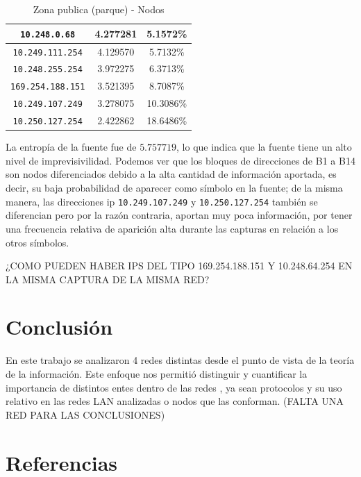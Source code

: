 \documentclass[final,inline,narroweqnarray,a4paper]{ieee}
\begin{document}
\begin{table}[H]
\begin{center}
\begin{tabular}{|c|c|c|}
            \texttt{10.248.0.68} &4.277281 &5.1572\%     \\ \hline 
            \texttt{10.249.111.254} &4.129570 &5.7132\%     \\ \hline 
            \texttt{10.248.255.254} &3.972275 &6.3713\%     \\ \hline 
            \texttt{169.254.188.151} &3.521395 &8.7087\%     \\ \hline 
            \texttt{10.249.107.249} &3.278075 &10.3086\%     \\ \hline 
            \texttt{10.250.127.254} &2.422862 &18.6486\%     \\ \hline                                    
        \end{tabular}
        \caption{Zona publica (parque) - Nodos}
        \label{table:parqueS1}
    \end{center}
\end{table}

La entropía de la fuente fue de $5.757719$, lo que indica que la fuente tiene un alto nivel de imprevisivilidad. Podemos ver que los bloques de direcciones de B1 a B14 son nodos diferenciados debido a la alta cantidad de información aportada, es decir, su baja probabilidad de aparecer como símbolo en la fuente; de la misma manera, las direcciones ip \texttt{10.249.107.249} y \texttt{10.250.127.254} también se diferencian pero por la razón contraria, aportan muy poca información, por tener una frecuencia relativa de aparición alta durante las capturas en relación a los otros símbolos.

¿COMO PUEDEN HABER IPS DEL TIPO 169.254.188.151 Y 10.248.64.254 EN LA MISMA CAPTURA DE LA MISMA RED?


\section{Conclusión}
En este trabajo se analizaron 4 redes distintas desde el punto de vista de la teoría de la información. Este enfoque nos permitió distinguir y cuantificar la importancia de distintos entes dentro de las redes , ya sean protocolos y su uso relativo en las redes LAN analizadas o nodos que las conforman. (FALTA UNA RED PARA LAS CONCLUSIONES)


\section{Referencias}
\end{document}
